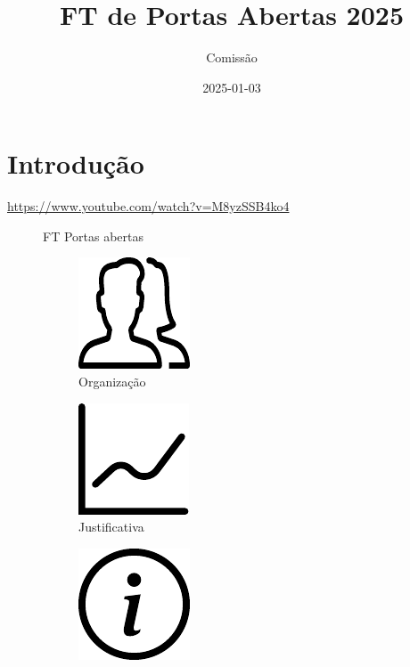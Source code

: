 \documentclass[
  letterpaper,
  DIV=11,
  numbers=noendperiod,
  oneside]{scrreprt}
\title{FT de Portas Abertas 2025}
\author{Comissão}
\date{2025-01-03}
\renewcommand*\contentsname{Table of contents}
\newcommand\contentsname{Table of contents}
\begin{document}
\maketitle

\renewcommand*\contentsname{Table of contents}
{
\hypersetup{linkcolor=}
\setcounter{tocdepth}{2}
\tableofcontents
}

\chapter{Introdução}\label{introduuxe7uxe3o}

\url{https://www.youtube.com/watch?v=M8yzSSB4ko4}

\begin{figure}

FT Portas abertas

\begin{figure}[H]

{\centering \includegraphics{index_files/mediabag/organizacao/organizacao.pdf}

}

\caption{Organização}

\end{figure}%

\begin{figure}[H]

{\centering \includegraphics{index_files/mediabag/justificativa/justificativa.pdf}

}

\caption{Justificativa}

\end{figure}%

\begin{figure}[H]

{\centering \includegraphics{index_files/mediabag/sobre/sobre.pdf}

}
\end{figure}
\end{figure}
\end{document}
